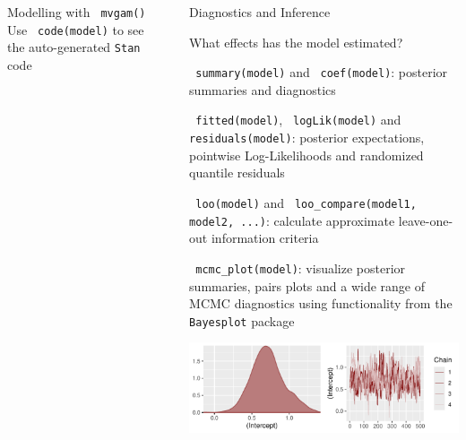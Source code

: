 \documentclass[final,9pt,fleqn]{beamer}\usepackage[]{graphicx}\usepackage[]{xcolor}
\makeatletter
\def\maxwidth{ %
  \ifdim\Gin@nat@width>\linewidth
    \linewidth
  \else
    \Gin@nat@width
  \fi
}
\newenvironment{knitrout}{}{} %
\makeatother
\begin{document}
\begin{frame}[fragile]
\begin{columns}
\begin{column}{0.3\paperwidth}
\begin{block}{{\fontsize{21}{21} \selectfont \color{BrickRed} Modelling with \texttt{\color{Orchid} mvgam()}}}
Use \texttt{\color{Orchid} code(model)} to see the auto-generated \texttt{Stan} code

\end{block}
\end{column}


\begin{column}{.03\paperwidth}
\end{column}


\begin{column}{0.3\paperwidth}
\vspace{0.52in}
\noindent\makebox[\linewidth]{\rule{0.3\paperwidth}{0.2pt}}
\begin{block}{{\fontsize{21}{21} \selectfont \color{BrickRed} Diagnostics and Inference}}

\smallskip
{{\fontsize{11}{11} \selectfont \color{mygray} What effects has the model estimated?}}

\medskip
\texttt{\color{Orchid} summary(model)} and \texttt{\color{Orchid} coef(model)}: posterior summaries and diagnostics

\medskip
\texttt{\color{Orchid} fitted(model)}, \texttt{\color{Orchid} logLik(model)} and \texttt{\color{Orchid} residuals(model)}: posterior expectations, pointwise Log-Likelihoods and randomized quantile residuals

\medskip
\texttt{\color{Orchid} loo(model)} and \texttt{\color{Orchid} loo\_compare(model1, model2, ...)}: calculate approximate leave-one-out information criteria

\medskip
\texttt{\color{Orchid} mcmc\_plot(model)}: visualize posterior summaries, pairs plots and a wide range of MCMC diagnostics using functionality from the \texttt{Bayesplot} package

\begin{knitrout}
\color{fgcolor}

{\centering \includegraphics[width=\maxwidth]{figure/unnamed-chunk-4-1} 

}


\end{knitrout}


\end{block}
\end{column}
\end{columns}
\end{frame}
\end{document}
